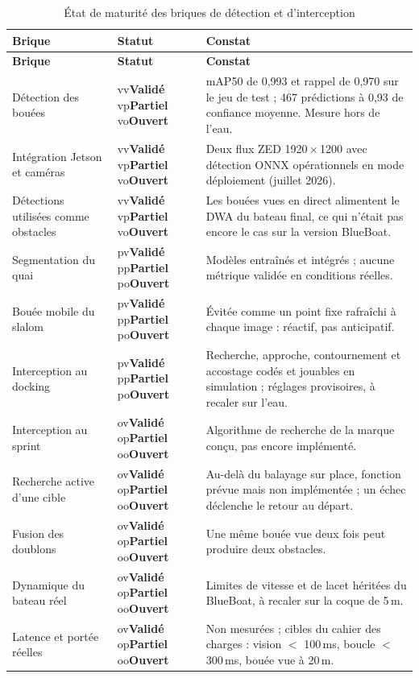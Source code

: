 \documentclass[11pt,letterpaper]{article}
\newcommand{\statut}[1]{%
    \ifx#1v{\color{okGreen}\textbf{Validé}}\fi%
    \ifx#1p{\color{warnAmber}\textbf{Partiel}}\fi%
    \ifx#1o{\color{openRed}\textbf{Ouvert}}\fi%
}
\begin{document}
\begingroup
\footnotesize
{}
\begin{longtable}{L{4.1cm}L{1.35cm}L{9.6cm}}
\caption{État de maturité des briques de détection et d'interception}\label{tab:maturite}\\
\toprule
\textbf{Brique} & \textbf{Statut} & \textbf{Constat} \\
\midrule
\endfirsthead
\toprule
\textbf{Brique} & \textbf{Statut} & \textbf{Constat} \\
\midrule
\endhead
Détection des bouées & \statut{v} & mAP50 de 0,993 et rappel de 0,970 sur le jeu de test ; 467 prédictions à 0,93 de confiance moyenne. Mesure hors de l'eau. \\
Intégration Jetson et caméras & \statut{v} & Deux flux ZED 1920\,$\times$\,1200 avec détection ONNX opérationnels en mode déploiement (juillet 2026). \\
Détections utilisées comme obstacles & \statut{v} & Les bouées vues en direct alimentent le DWA du bateau final, ce qui n'était pas encore le cas sur la version BlueBoat. \\
Segmentation du quai & \statut{p} & Modèles entraînés et intégrés ; aucune métrique validée en conditions réelles. \\
Bouée mobile du slalom & \statut{p} & Évitée comme un point fixe rafraîchi à chaque image : réactif, pas anticipatif. \\
Interception au docking & \statut{p} & Recherche, approche, contournement et accostage codés et jouables en simulation ; réglages provisoires, à recaler sur l'eau. \\
Interception au sprint & \statut{o} & Algorithme de recherche de la marque conçu, pas encore implémenté. \\
Recherche active d'une cible & \statut{o} & Au-delà du balayage sur place, fonction prévue mais non implémentée ; un échec déclenche le retour au départ. \\
Fusion des doublons & \statut{o} & Une même bouée vue deux fois peut produire deux obstacles. \\
Dynamique du bateau réel & \statut{o} & Limites de vitesse et de lacet héritées du BlueBoat, à recaler sur la coque de 5\,m. \\
Latence et portée réelles & \statut{o} & Non mesurées ; cibles du cahier des charges : vision $<$ 100\,ms, boucle $<$ 300\,ms, bouée vue à 20\,m. \\
\bottomrule
\end{longtable}
\endgroup
\end{document}
